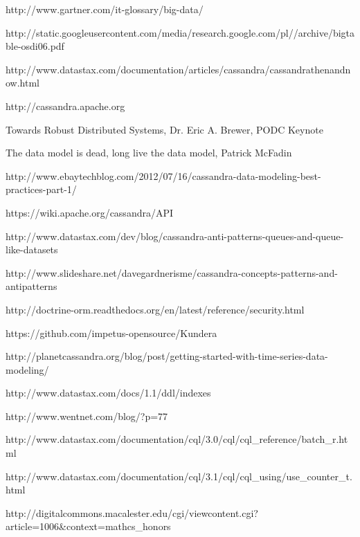 \begin{thebibliography}{9}

http://www.gartner.com/it-glossary/big-data/

http://static.googleusercontent.com/media/research.google.com/pl//archive/bigtable-osdi06.pdf

http://www.datastax.com/documentation/articles/cassandra/cassandrathenandnow.html

http://cassandra.apache.org

Towards Robust Distributed Systems, Dr. Eric A. Brewer, PODC Keynote

The data model is dead, long live the data model, Patrick McFadin

http://www.ebaytechblog.com/2012/07/16/cassandra-data-modeling-best-practices-part-1/

https://wiki.apache.org/cassandra/API

http://www.datastax.com/dev/blog/cassandra-anti-patterns-queues-and-queue-like-datasets

http://www.slideshare.net/davegardnerisme/cassandra-concepts-patterns-and-antipatterns

http://doctrine-orm.readthedocs.org/en/latest/reference/security.html

https://github.com/impetus-opensource/Kundera

http://planetcassandra.org/blog/post/getting-started-with-time-series-data-modeling/

http://www.datastax.com/docs/1.1/ddl/indexes

http://www.wentnet.com/blog/?p=77

http://www.datastax.com/documentation/cql/3.0/cql/cql\_reference/batch\_r.html

http://www.datastax.com/documentation/cql/3.1/cql/cql\_using/use\_counter\_t.html

http://digitalcommons.macalester.edu/cgi/viewcontent.cgi?article=1006\&context=mathcs\_honors


\end{thebibliography}

